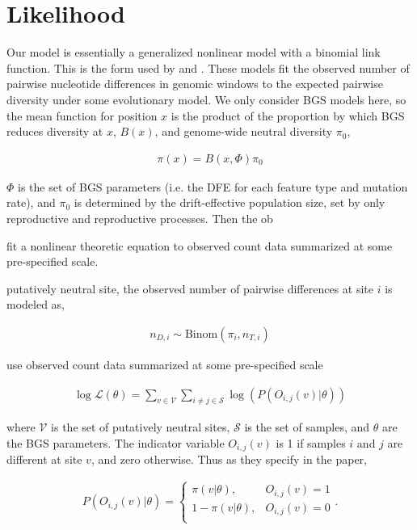 \documentclass[11pt]{article}
\begin{document}
\section*{Likelihood}

Our model is essentially a generalized nonlinear model with a binomial link
function. This is the form used by \textcite{Elyashiv2016-vt} and
\textcite{Murphy2022-sj}. These models fit the observed number of pairwise
nucleotide differences in genomic windows to the expected pairwise diversity
under some evolutionary model. We only consider BGS models here, so the mean
function for position $x$ is the product of the proportion by which BGS reduces
diversity at $x$, $B(x)$, and genome-wide neutral diversity $\pi_0$,

\begin{align}
  \pi(x) = B(x, \Phi) \pi_0
\end{align}

$\Phi$ is the set of BGS parameters (i.e. the DFE for each feature type and
mutation rate), and $\pi_0$ is determined by the drift-effective population
size, set by only reproductive and reproductive processes. Then the ob



fit a nonlinear theoretic equation to
observed count data summarized at some pre-specified scale. 

putatively neutral site, the observed number of pairwise differences at site
$i$ is modeled as,

\begin{align}
  n_{D,i} \sim \text{Binom}(\pi_i, n_{T,i})
\end{align}

use observed count data summarized at
some pre-specified scale 

\begin{align}
  \log\mathcal{L}(\theta) = \sum_{v \in \mathcal{V}} \sum_{i \ne j \in \mathcal{S}} \log(P(O_{i,j}(v) | \theta))
\end{align}

where $\mathcal{V}$ is the set of putatively neutral sites, $\mathcal{S}$ is
the set of samples, and $\theta$ are the BGS parameters. The indicator variable
$O_{i,j}(v)$ is 1 if samples $i$ and $j$ are different at site $v$, and zero
otherwise. Thus as they specify in the paper, 

\begin{align}
  P(O_{i,j}(v) | \theta) = 
    \begin{cases}
      \pi(v | \theta), & O_{i,j}(v) = 1 \\
      1-\pi(v | \theta), & O_{i,j}(v) = 0 \\
    \end{cases}.
\end{align}
\end{document}
